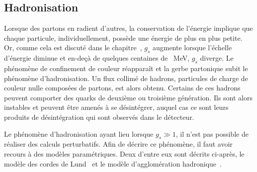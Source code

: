 \subsection{Hadronisation}\label{chapter-JERC-section-jets-subsec-hadronisation}
Lorsque des partons en radient d'autres, la conservation de l'énergie implique que chaque particule, individuellement, possède une énergie de plus en plus petite.
Or, comme cela est discuté dans le chapitre~, $g_s$ augmente lorsque l'échelle d'énergie diminue et en-deçà de quelques centaines de \SI{}{\MeV}, $g_s$ diverge.
Le phénomène de confinement de couleur réapparaît et la gerbe partonique subit le phénomène d'hadronisation.
Un flux collimé de hadrons, particules de charge de couleur nulle composées de partons, est alors obtenu.
Certains de ces hadrons peuvent comporter des quarks de deuxième ou troisième génération. Ils sont alors instables et peuvent être amenés à se désintégrer, auquel cas ce sont leurs produits de désintégration qui sont observés dans le détecteur.
\par Le phénomène d'hadronisation ayant lieu lorsque $g_s\gg1$, il n'est pas possible de réaliser des calculs perturbatifs. Afin de décrire ce phénomène, il faut avoir recours à des modèles paramétriques. Deux d'entre eux sont décrits ci-après, le modèle des cordes de Lund~\cite{Andersson_parton_fragmentation} et le modèle d'agglomération hadronique~\cite{Winter_2004}.
